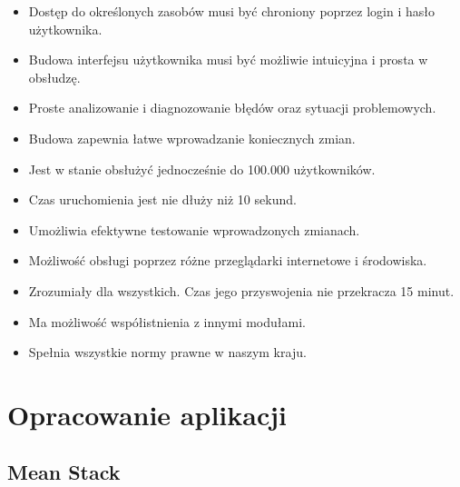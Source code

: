 \documentclass[12pt]{report}
\begin{document}
\begin{itemize}
\item Dostęp do określonych zasobów musi być chroniony poprzez login i hasło użytkownika.
\item Budowa interfejsu użytkownika musi być możliwie intuicyjna i prosta w obsłudzę.
\item Proste analizowanie i diagnozowanie błędów oraz sytuacji problemowych.
\item Budowa zapewnia łatwe wprowadzanie koniecznych zmian.
\item Jest w stanie obsłużyć jednocześnie do 100.000 użytkowników.
\item Czas uruchomienia jest nie dłuży niż 10 sekund.
\item Umożliwia efektywne testowanie wprowadzonych zmianach.
\item Możliwość obsługi poprzez różne przeglądarki internetowe i środowiska.
\item Zrozumiały dla wszystkich. Czas jego przyswojenia nie przekracza 15 minut.
\item Ma możliwość współistnienia z innymi modułami.
\item Spełnia wszystkie normy prawne w naszym kraju.
\end{itemize}

\chapter{Opracowanie aplikacji}

\section{Mean Stack}
\end{document}
